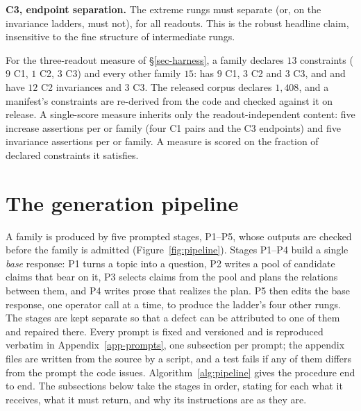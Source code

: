 \textbf{C3, endpoint separation.} The extreme rungs must separate (or, on the invariance ladders, must not),
for all readouts. This is the robust headline claim, insensitive to the fine structure of intermediate
rungs.

For the three-readout measure of \S\ref{sec-harness}, a  family declares $13$
constraints ($9$ C1, $1$ C2, $3$ C3) and every other family $15$:  has $9$ C1, $3$ C2 and
$3$ C3, and  and  have $12$ C2 invariances and $3$ C3. The released corpus
declares $1{,}408$, and a manifest's constraints are re-derived from the code and checked against it on
release. A single-score measure inherits only the
readout-independent content: five increase assertions per  or  family (four
C1 pairs and the C3 endpoints) and five invariance assertions per  or  family.
A measure is scored on the fraction of declared constraints it satisfies.

\section{The generation pipeline}
\label{sec-generation}

A family is produced by five prompted stages, P1--P5, whose outputs are checked before the family is admitted
(Figure~\ref{fig:pipeline}). Stages P1--P4 build a single \emph{base} response: P1 turns a topic into a question,
P2 writes a pool of candidate claims that bear on it, P3 selects claims from the pool and plans the relations
between them, and P4 writes prose that realizes the plan. P5 then edits the base response, one operator call at a
time, to produce the ladder's four other rungs. The stages are kept separate so that a defect can be attributed to
one of them and repaired there. Every prompt is fixed and versioned and is reproduced verbatim in
Appendix~\ref{app-prompts}, one subsection per prompt; the appendix files are written from the source by a script,
and a test fails if any of them differs from the prompt the code issues. Algorithm~\ref{alg:pipeline} gives the
procedure end to end. The subsections below take the stages in order, stating for each what it receives, what it
must return, and why its instructions are as they are.

